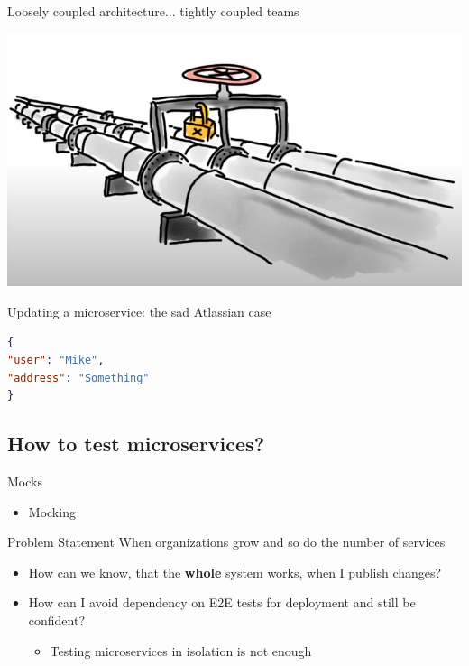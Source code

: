 \begin{frame}{Loosely coupled architecture... tightly coupled teams}
  \begin{center}
    \includegraphics[scale=.47]{./assets/coupling.png}
  \end{center}
\end{frame}

\begin{frame}[fragile]{Updating a microservice: the sad Atlassian case}
  \begin{lstlisting}[language=json]
{
"user": "Mike",
"address": "Something"
}
    \end{lstlisting}
\end{frame}

\subsection{How to test microservices?}
\begin{frame}{Mocks}
  \begin{itemize}
    \item Mocking
  \end{itemize}
\end{frame}


\begin{frame}{Problem Statement}
  When organizations grow and so do the number of services
  \begin{itemize}
    \item How can we know, that the \textbf{whole} system works, when I publish changes?
    \item How can I avoid dependency on E2E tests for deployment and still be confident?
    \begin{itemize}
      \item Testing microservices in isolation is not enough
    \end{itemize}
  \end{itemize}
\end{frame}

